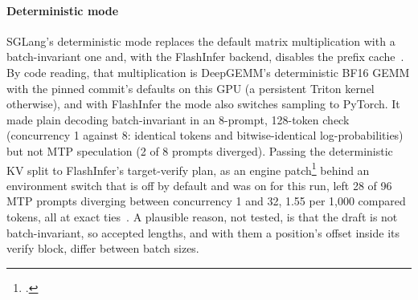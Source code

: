 \paragraph{Deterministic mode} SGLang's deterministic mode replaces the default matrix multiplication with a batch-invariant one and, with the FlashInfer backend, disables the prefix cache~\cite{sglangdeterministic}. By code reading, that multiplication is DeepGEMM's deterministic BF16 GEMM with the pinned commit's defaults on this GPU (a persistent Triton kernel otherwise), and with FlashInfer the mode also switches sampling to PyTorch. It made plain decoding batch-invariant in an 8-prompt, 128-token check (concurrency 1 against 8: identical tokens and bitwise-identical log-probabilities) but not MTP speculation (2 of 8 prompts diverged). Passing the deterministic KV split to FlashInfer's target-verify plan, as an engine patch\footnote{.} behind an environment switch that is off by default and was on for this run, left 28 of 96 MTP prompts diverging between concurrency 1 and 32, 1.55 per 1,000 compared tokens, all at exact ties~. A plausible reason, not tested, is that the draft is not batch-invariant, so accepted lengths, and with them a position's offset inside its verify block, differ between batch sizes.

